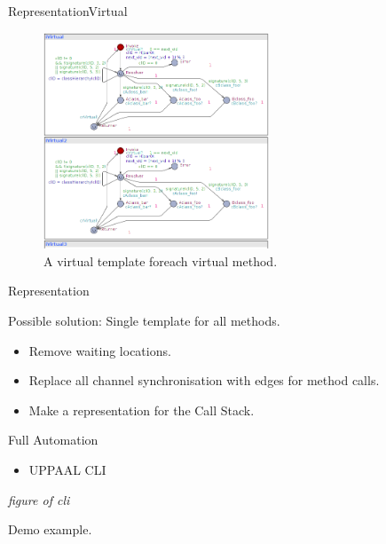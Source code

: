 \begin{frame}[fragile]{Representation}{Virtual}
\begin{figure}
\centering
\includegraphics[width=0.6\textwidth]{figures/newVirtual.png}
\caption{\footnotesize A virtual template foreach virtual method.}
\end{figure}
\end{frame}

\begin{frame}{Representation}{}
\begin{block}{Possible solution: Single template for all methods.}
\begin{itemize}
\item Remove waiting locations.
\item Replace all channel synchronisation with edges for method calls.
\item Make a representation for the Call Stack.
\end{itemize}

\end{block}
\end{frame}


\begin{frame}{Full Automation}{}
\begin{itemize}
\item UPPAAL CLI
\end{itemize}
\textit{figure of cli}
\end{frame}

\begin{frame}{Demo}{}
example.
\end{frame}

